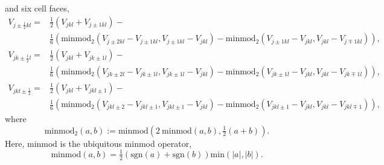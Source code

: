 \documentclass{aastex63}
\begin{document}
and six cell faces,
\begin{equation}
\begin{split}
V_{j \pm \tfrac{1}{2} k l } = & 
\frac{1}{2}\left(V_{ j k l } + V_{j \pm 1 k l}\right) - \\
& \frac{1}{6}\left(
\mathrm{minmod}_2 \left(V_{j \pm 2 k l} - V_{j \pm 1 k l }, V_{j \pm 1 k l} - V_{j k l }   \right) -
\mathrm{minmod}_2 \left(V_{j \pm 1 k l} - V_{j k l}, V_{j k l } - V_{j \mp 1 k l}   \right)
\right),
\end{split}
\end{equation}
\begin{equation}
\begin{split}
V_{j  k \pm \tfrac{1}{2} l} = & 
\frac{1}{2}\left(V_{ j k l } + V_{j k \pm 1 l}\right) - \\
& \frac{1}{6}\left(
\mathrm{minmod}_2 \left(V_{j k \pm 2 l} - V_{j k \pm 1 l }, V_{j k \pm 1 l } - V_{j k l }   \right) -
\mathrm{minmod}_2 \left(V_{j k \pm 1 l} - V_{j k l}, V_{j k l } - V_{j k \mp 1 l }   \right)
\right),
\end{split}
\end{equation}
\begin{equation}
\begin{split}
V_{j  k l \pm \tfrac{1}{2}} = & 
\frac{1}{2}\left(V_{ j k l } + V_{j k l \pm 1}\right) - \\
& \frac{1}{6}\left(
\mathrm{minmod}_2 \left(V_{j k l \pm 2} - V_{j k l \pm  1}, V_{j k l \pm 1} - V_{j k l }   \right) -
\mathrm{minmod}_2 \left(V_{j k l \pm 1} - V_{j k l}, V_{j k l } - V_{j k l \mp 1 }   \right)
\right),
\end{split}
\end{equation}
where
\begin{equation}
\mathrm{minmod}_2 \left( a, b \right) := \mathrm{minmod} \left( 2 \ \mathrm{minmod}\left(a,b\right), \tfrac{1}{2}\left(a + b\right)\right).
\end{equation}
Here, $\mathrm{minmod}$ is the ubiquitous minmod operator, 
\begin{equation}
\mathrm{minmod}\left(a,b\right) = \tfrac{1}{2}\left(\mathrm{sgn}\left(a\right)+\mathrm{sgn}\left(b\right)\right) \mathrm{min}\left( | a |, | b | \right).
\end{equation}
\end{document}
